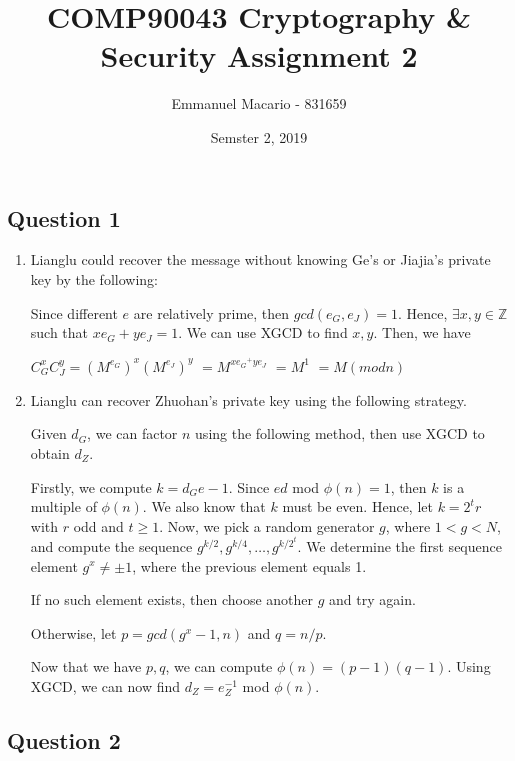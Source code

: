 \documentclass[12pt]{article}
\author{Emmanuel Macario - 831659}
\title{COMP90043 Cryptography \& Security Assignment 2}
\date{Semster 2, 2019}
\begin{document}
\maketitle

\subsection*{Question 1}

\begin{enumerate}
\item Lianglu could recover the message without knowing Ge's or Jiajia's private key by the following:

Since different $e$ are relatively prime, then $gcd(e_{G}, e_{J})=1$. Hence, $\exists x, y \in \mathbb{Z}$ such 
that $xe_{G}+ye_{J}=1$. We can use XGCD to find $x, y$. Then, we have


\begin{center}
$C_{G}^{x} C_{J}^{y} = (M^{e_{G}})^{x} (M^{e_{J}})^{y}$
$                                  =  M^{{x e_{G}}^+{y e_{J}}}$
$                                  = M^{1}$
$                                  = M (mod n)$

\end{center}

\item Lianglu can recover Zhuohan's private key using the following strategy.

Given $d_{G}$, we can factor $n$ using the following method, then use XGCD to obtain $d_{Z}$.

Firstly, we compute $k=d_{G}e - 1$. Since $ed$ mod $\phi (n) = 1$, then $k$ is a multiple of $\phi (n)$. 
We also know that $k$ must be even. Hence, let $k=2^{t}r$ with $r$ odd and $t \geq 1$. Now, we pick a random
generator $g$, where $1 < g < N$, and compute the sequence $g^{k/2}, g^{k/4}, \dots, g^{k/2^{t}}$. We determine
the first sequence element $g^{x} \neq \pm 1$, where the previous element equals {1}.

If no such element exists, then choose another $g$ and try again.

Otherwise, let $p = gcd(g^{x}-1, n)$ and $q = n/p$.


Now that we have $p, q$, we can compute $\phi (n) = (p-1)(q-1)$. Using XGCD, we can now find
$d_{Z} = e_{Z}^{-1}$ mod $\phi (n)$.


\end{enumerate}


\subsection*{Question 2}
\end{document}
